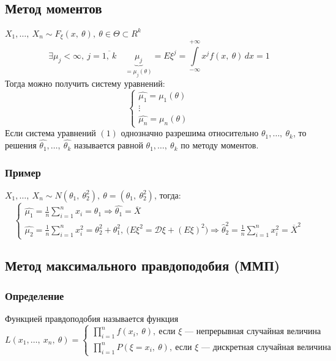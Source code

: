 \documentclass[12pt, a4paper]{article}
\newcommand{\sion}{\sum\limits_{i = 1}^{n}}
\newcommand{\dev}{\mathcal{D}}
\begin{document}
\subsection*{Метод моментов}
$X_1,\dots,\ X_n\sim F_{\xi}(x,\ \theta),\ \theta \in \Theta\subset R^k$
\[\exists \mu_j < \infty,\ j = \overline{1,\ k}\quad \underset{=\mu_j(\theta)}{\underbrace{\mu_j}} = E\xi^j = \int\limits_{-\infty}^{+\infty} x^j f(x,\ \theta)\, dx = 1\]
Тогда можно получить систему уравнений:
\begin{equation}
    \begin{cases}
        \hat{\mu_1} = \mu_1(\theta)\\
        \vdots\\
        \hat{\mu_n} = \mu_n(\theta)
    \end{cases}
\end{equation}
Если система уравнений $(1)$ однозначно разрешима относительно $\theta_1,\dots,\ \theta_k$, то решения $\hat{\theta_1},\dots,\ \hat{\theta_k}$ называется равной $\theta_1,\dots,\ \theta_k$ по методу моментов.
\subsubsection*{Пример}
$X_1,\dots,\ X_n \sim N(\theta_1,\ \theta_2^2),\ \theta = (\theta_1,\ \theta_2^2)$, тогда:
\[\begin{cases}
    \hat{\mu_1} = \frac{1}{n} \sion x_i = \theta_1\Rightarrow \hat{\theta_1} = \overline{X}\\
    \hat{\mu_2} = \frac{1}{n} \sion x_i^2 = \theta_2^2 + \theta_1^2,\ \big(E\xi^2 = \dev \xi + (E\xi)^2\big)\Rightarrow \hat{\theta}_2^2 = \frac{1}{n}\sion  x_i^2 = \overline{X}^2
\end{cases}\]
\subsection*{Метод максимального правдоподобия (ММП)}
\subsubsection*{Определение}
Функцией правдоподобия называется функция 
\[L(x_1,\dots,\ x_n,\ \theta) = \begin{cases}
    \prod\limits_{i = 1}^{n} f(x_i,\ \theta),\ \text{если $\xi$ --- непрерывная случайная величина}\\
    \prod\limits_{i = 1}^{n} P(\xi = x_i,\ \theta),\ \text{если $\xi$ --- дискретная случайная величина}
\end{cases}\]
\end{document}
